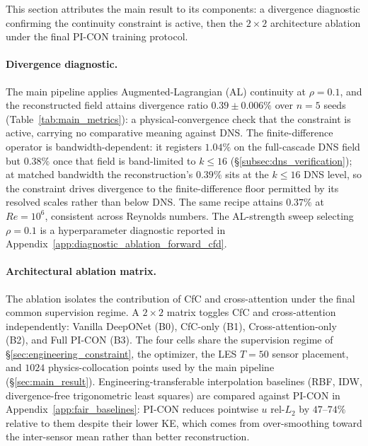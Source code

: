This section attributes the main result to its components: a divergence diagnostic confirming the continuity constraint is active, then the $2\times2$ architecture ablation under the final PI-CON training protocol.

\paragraph{Divergence diagnostic.}
\label{sec:sub_dns_div}
The main pipeline applies Augmented-Lagrangian (AL) continuity at $\rho=0.1$, and the reconstructed field attains divergence ratio $0.39 \pm 0.006\%$ over $n=5$ seeds (Table~\ref{tab:main_metrics}): a physical-convergence check that the constraint is active, carrying no comparative meaning against DNS. The finite-difference operator is bandwidth-dependent: it registers $1.04\%$ on the full-cascade DNS field but $0.38\%$ once that field is band-limited to $k\le 16$ (\S\ref{subsec:dns_verification}); at matched bandwidth the reconstruction's $0.39\%$ sits at the $k\le 16$ DNS level, so the constraint drives divergence to the finite-difference floor permitted by its resolved scales rather than below DNS. The same recipe attains $0.37\%$ at $Re=10^{6}$, consistent across Reynolds numbers. The AL-strength sweep selecting $\rho=0.1$ is a hyperparameter diagnostic reported in Appendix~\ref{app:diagnostic_ablation_forward_cfd}.

\paragraph{Architectural ablation matrix.}
\label{sec:baseline_comparison}
The ablation isolates the contribution of CfC and cross-attention under the final common supervision regime. A $2\times2$ matrix toggles CfC and cross-attention independently: Vanilla DeepONet (B0), CfC-only (B1), Cross-attention-only (B2), and Full PI-CON (B3). The four cells share the supervision regime of \S\ref{sec:engineering_constraint}, the optimizer, the LES $T=50$ sensor placement, and $1024$ physics-collocation points used by the main pipeline (\S\ref{sec:main_result}). Engineering-transferable interpolation baselines (RBF, IDW, divergence-free trigonometric least squares) are compared against PI-CON in Appendix~\ref{app:fair_baselines}: PI-CON reduces pointwise $u$ rel-$L_2$ by $47$--$74\%$ relative to them despite their lower KE, which comes from over-smoothing toward the inter-sensor mean rather than better reconstruction.

